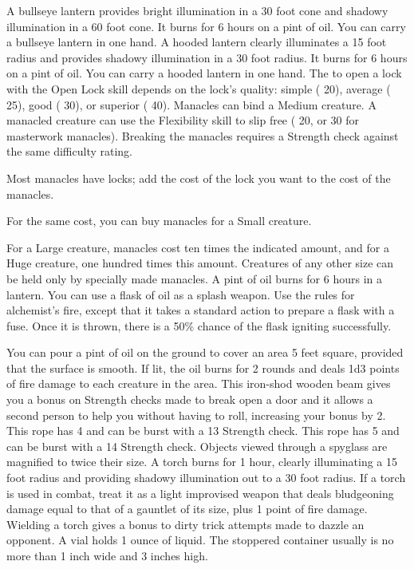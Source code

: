          A bullseye lantern provides bright illumination in a 30 foot cone and shadowy illumination in a 60 foot cone. It burns for 6 hours on a pint of oil. You can carry a bullseye lantern in one hand.
         A hooded lantern clearly illuminates a 15 foot radius and provides shadowy illumination in a 30 foot radius. It burns for 6 hours on a pint of oil. You can carry a hooded lantern in one hand.
         The  to open a lock with the Open Lock skill depends on the lock's quality: simple ( 20), average ( 25), good ( 30), or superior ( 40).
         Manacles can bind a Medium creature. A manacled creature can use the Flexibility skill to slip free ( 20, or  30 for masterwork manacles). Breaking the manacles requires a Strength check against the same difficulty rating.
        \par Most manacles have locks; add the cost of the lock you want to the cost of the manacles.
        \par For the same cost, you can buy manacles for a Small creature.
        \par For a Large creature, manacles cost ten times the indicated amount, and for a Huge creature, one hundred times this amount. Creatures of any other size can be held only by specially made manacles.
         A pint of oil burns for 6 hours in a lantern. You can use a flask of oil as a splash weapon. Use the rules for alchemist's fire, except that it takes a standard action to prepare a flask with a fuse. Once it is thrown, there is a 50\% chance of the flask igniting successfully.
        \par You can pour a pint of oil on the ground to cover an area 5 feet square, provided that the surface is smooth. If lit, the oil burns for 2 rounds and deals 1d3 points of fire damage to each creature in the area.
         This iron-shod wooden beam gives you a  bonus on Strength checks made to break open a door and it allows a second person to help you without having to roll, increasing your bonus by 2.
         This rope has 4  and can be burst with a  13 Strength check.
         This rope has 5  and can be burst with a  14 Strength check.
         Objects viewed through a spyglass are magnified to twice their size.
         A torch burns for 1 hour, clearly illuminating a 15 foot radius and providing shadowy illumination out to a 30 foot radius. If a torch is used in combat, treat it as a light improvised weapon that deals bludgeoning damage equal to that of a gauntlet of its size, plus 1 point of fire damage. Wielding a torch gives a  bonus to dirty trick attempts made to dazzle an opponent.
         A vial holds 1 ounce of liquid. The stoppered container usually is no more than 1 inch wide and 3 inches high.

